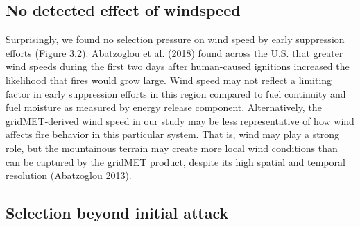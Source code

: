 \documentclass[twoside,12pt,final]{ucthesis-CA2012}
\begin{document}
\begin{ucmainmatter}
\subsection{No detected effect of
windspeed}\label{no-detected-effect-of-windspeed}

Surprisingly, we found no selection pressure on wind speed by early
suppression efforts (Figure 3.2). Abatzoglou et al.
(\protect\hyperlink{ref-abatzoglou2018a}{2018}) found across the U.S.
that greater wind speeds during the first two days after human-caused
ignitions increased the likelihood that fires would grow large. Wind
speed may not reflect a limiting factor in early suppression efforts in
this region compared to fuel continuity and fuel moisture as measured by
energy release component. Alternatively, the gridMET-derived wind speed
in our study may be less representative of how wind affects fire
behavior in this particular system. That is, wind may play a strong
role, but the mountainous terrain may create more local wind conditions
than can be captured by the gridMET product, despite its high spatial
and temporal resolution (Abatzoglou
\protect\hyperlink{ref-abatzoglou2013}{2013}).

\subsection{Selection beyond initial
attack}\label{selection-beyond-initial-attack}


\end{ucmainmatter}
\end{document}

